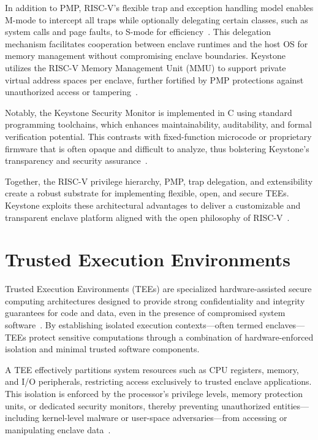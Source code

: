 In addition to PMP, RISC-V’s flexible trap and exception handling model enables M-mode to intercept all traps while optionally delegating certain classes, such as system calls and page faults, to S-mode for efficiency~\cite{lee2019keystone}. This delegation mechanism facilitates cooperation between enclave runtimes and the host OS for memory management without compromising enclave boundaries. Keystone utilizes the RISC-V Memory Management Unit (MMU) to support private virtual address spaces per enclave, further fortified by PMP protections against unauthorized access or tampering~\cite{dayeol2019keystone}.

Notably, the Keystone Security Monitor is implemented in C using standard programming toolchains, which enhances maintainability, auditability, and formal verification potential. This contrasts with fixed-function microcode or proprietary firmware that is often opaque and difficult to analyze, thus bolstering Keystone’s transparency and security assurance~\cite{lee2019keystone}.

Together, the RISC-V privilege hierarchy, PMP, trap delegation, and extensibility create a robust substrate for implementing flexible, open, and secure TEEs. Keystone exploits these architectural advantages to deliver a customizable and transparent enclave platform aligned with the open philosophy of RISC-V~\cite{Survey2023}.

\section{Trusted Execution Environments}

Trusted Execution Environments (TEEs) are specialized hardware-assisted secure computing architectures designed to provide strong confidentiality and integrity guarantees for code and data, even in the presence of compromised system software~\cite{Survey2023,suzaki2021tsperf}. By establishing isolated execution contexts—often termed enclaves—TEEs protect sensitive computations through a combination of hardware-enforced isolation and minimal trusted software components.

A TEE effectively partitions system resources such as CPU registers, memory, and I/O peripherals, restricting access exclusively to trusted enclave applications. This isolation is enforced by the processor’s privilege levels, memory protection units, or dedicated security monitors, thereby preventing unauthorized entities—including kernel-level malware or user-space adversaries—from accessing or manipulating enclave data~\cite{brasser2019software}.

